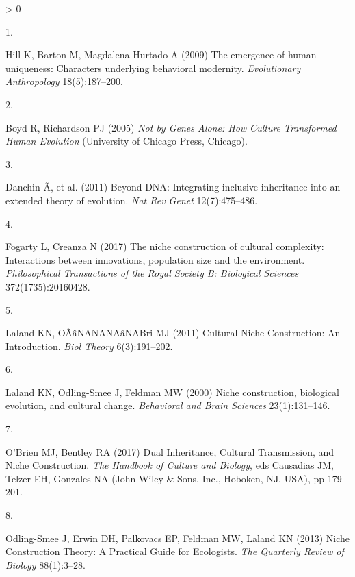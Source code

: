 \documentclass[9pt,twocolumn,twoside,]{pnas-new}
\newlength{\csllabelwidth}
\newlength{\cslhangindent}
\newenvironment{CSLReferences}[3] %
 {%
  \setlength{\parindent}{0pt}
  \ifodd #1 \everypar{\setlength{\hangindent}{\cslhangindent}}\ignorespaces\fi
  \ifnum #2 > 0
  \setlength{\parskip}{#2\baselineskip}
  \fi
 }%
 {}
\newcommand{\CSLLeftMargin}[1]{\parbox[t]{\csllabelwidth}{#1}}
\newcommand{\CSLRightInline}[1]{\parbox[t]{\linewidth - \csllabelwidth}{#1}}
\begin{document}
\hypertarget{refs}{}
\begin{CSLReferences}{0}{0}
\leavevmode\hypertarget{ref-hillEmergenceHumanUniqueness2009}{}%
\CSLLeftMargin{1. }
\CSLRightInline{Hill K, Barton M, Magdalena Hurtado A (2009) The
emergence of human uniqueness: {Characters} underlying behavioral
modernity. \emph{Evolutionary Anthropology} 18(5):187--200.}

\leavevmode\hypertarget{ref-boydNotGenesAlone2005}{}%
\CSLLeftMargin{2. }
\CSLRightInline{Boyd R, Richardson PJ (2005) \emph{Not by {Genes Alone}:
{How Culture Transformed Human Evolution}} ({University of Chicago
Press}, {Chicago}).}

\leavevmode\hypertarget{ref-danchinDNAIntegratingInclusive2011}{}%
\CSLLeftMargin{3. }
\CSLRightInline{Danchin Ã, et al. (2011) Beyond {DNA}: Integrating
inclusive inheritance into an extended theory of evolution. \emph{Nat
Rev Genet} 12(7):475--486.}

\leavevmode\hypertarget{ref-fogartyNicheConstructionCultural2017}{}%
\CSLLeftMargin{4. }
\CSLRightInline{Fogarty L, Creanza N (2017) The niche construction of
cultural complexity: Interactions between innovations, population size
and the environment. \emph{Philosophical Transactions of the Royal
Society B: Biological Sciences} 372(1735):20160428.}

\leavevmode\hypertarget{ref-lalandCulturalNicheConstruction2011}{}%
\CSLLeftMargin{5. }
\CSLRightInline{Laland KN, OÃâNANANAâNABri MJ (2011) Cultural {Niche
Construction}: {An Introduction}. \emph{Biol Theory} 6(3):191--202.}

\leavevmode\hypertarget{ref-lalandNicheConstructionBiological2000}{}%
\CSLLeftMargin{6. }
\CSLRightInline{Laland KN, Odling-Smee J, Feldman MW (2000) Niche
construction, biological evolution, and cultural change.
\emph{Behavioral and Brain Sciences} 23(1):131--146.}

\leavevmode\hypertarget{ref-obrienDualInheritanceCultural2017}{}%
\CSLLeftMargin{7. }
\CSLRightInline{O'Brien MJ, Bentley RA (2017) Dual {Inheritance},
{Cultural Transmission}, and {Niche Construction}. \emph{The {Handbook}
of {Culture} and {Biology}}, eds Causadias JM, Telzer EH, Gonzales NA
({John Wiley \& Sons, Inc.}, {Hoboken, NJ, USA}), pp 179--201.}

\leavevmode\hypertarget{ref-odling-smeeNicheConstructionTheory2013}{}%
\CSLLeftMargin{8. }
\CSLRightInline{Odling-Smee J, Erwin DH, Palkovacs EP, Feldman MW,
Laland KN (2013) Niche {Construction Theory}: {A Practical Guide} for
{Ecologists}. \emph{The Quarterly Review of Biology} 88(1):3--28.}


\end{CSLReferences}
\end{document}
